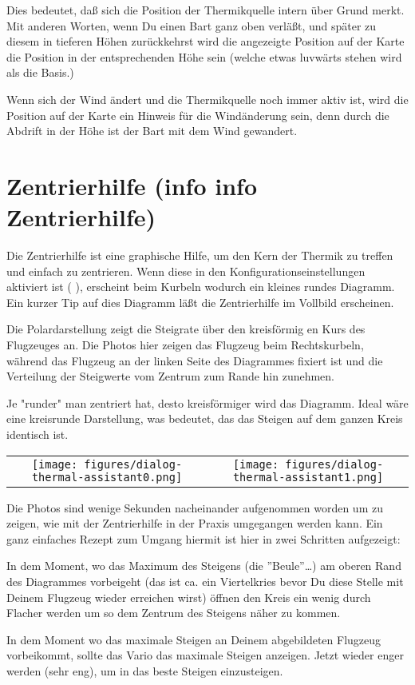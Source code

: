 Dies bedeutet, daß \xc sich die Position der Thermikquelle intern über Grund merkt.
Mit anderen Worten, wenn Du einen Bart ganz oben verläßt, und später zu diesem in tieferen
Höhen zurückkehrst wird die angezeigte Position auf der Karte die Position in der
entsprechenden Höhe sein (welche etwas luvwärts stehen wird als die Basis.)

Wenn sich der Wind ändert und die Thermikquelle noch immer aktiv ist,
wird die Position auf der Karte ein Hinweis für die Windänderung sein, denn
durch die Abdrift in der Höhe ist der Bart mit dem Wind gewandert.

\section{Zentrierhilfe (info info Zentrierhilfe)}
Die Zentrierhilfe ist eine graphische Hilfe, um den Kern der Thermik zu treffen und einfach zu zentrieren.
Wenn diese in den Konfigurationseinstellungen aktiviert ist ( ), erscheint beim
Kurbeln wodurch ein kleines  rundes Diagramm. Ein kurzer Tip auf dies Diagramm läßt die Zentrierhilfe im Vollbild erscheinen.

Die Polardarstellung zeigt die Steigrate über den kreisförmig en Kurs des Flugzeuges an.
Die Photos hier zeigen das Flugzeug beim Rechtskurbeln, während das Flugzeug an der linken
Seite des Diagrammes fixiert ist und die Verteilung der Steigwerte vom Zentrum zum Rande hin zunehmen.

Je "runder" man zentriert hat, desto kreisförmiger wird das Diagramm. Ideal wäre eine kreisrunde
Darstellung, was bedeutet, das das Steigen auf dem ganzen Kreis identisch ist.

\begin{tabular}{c c}
\texttt{[image: figures/dialog-thermal-assistant0.png]}&
\texttt{[image: figures/dialog-thermal-assistant1.png]}\\
\end{tabular}

Die Photos sind wenige Sekunden nacheinander aufgenommen worden um zu zeigen, wie mit der Zentrierhilfe
in  der Praxis umgegangen  werden kann. Ein ganz einfaches Rezept zum Umgang hiermit ist hier in zwei Schritten aufgezeigt:

\begin{description}
\item[1.]  In dem Moment, wo das Maximum des Steigens  (die ''Beule''\dots) am  oberen Rand des Diagrammes  vorbeigeht
(das ist ca. ein Viertelkries bevor Du diese Stelle mit Deinem Flugzeug wieder erreichen wirst) öffnen den
Kreis ein wenig durch Flacher werden um so dem Zentrum des Steigens näher zu kommen.
\item[2.]  In dem Moment wo das maximale Steigen an Deinem abgebildeten Flugzeug vorbeikommt,
sollte das Vario das maximale Steigen anzeigen. Jetzt wieder enger werden (sehr eng), um in das
beste Steigen einzusteigen.
\end{description}

